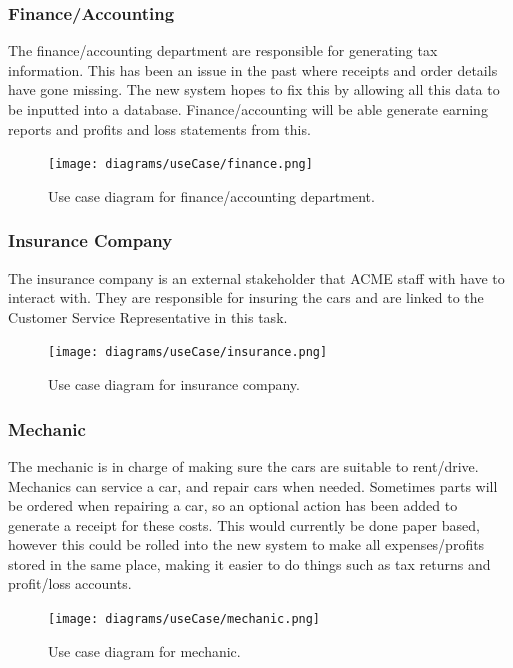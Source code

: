     \subsubsection{Finance/Accounting}
      The finance/accounting department are responsible for generating tax information. This has been an issue in the past where
      receipts and order details have gone missing. The new system hopes to fix this by allowing all this data to be inputted into 
      a database. Finance/accounting will be able generate earning reports and profits and loss statements from this.
      \begin{figure}[H]
        \centering
        \texttt{[image: diagrams/useCase/finance.png]}
        \caption{Use case diagram for finance/accounting department.}
        \label{fig:UCaccounting}
      \end{figure}

    \subsubsection{Insurance Company}
      The insurance company is an external stakeholder that ACME staff with have to interact with. They are responsible for insuring the cars and
      are linked to the Customer Service Representative in this task.
      \begin{figure}[H]
        \centering
        \texttt{[image: diagrams/useCase/insurance.png]}
        \caption{Use case diagram for insurance company.}
        \label{fig:UCinsurance}
      \end{figure}
      
    \subsubsection{Mechanic}
      The mechanic is in charge of making sure the cars are suitable to rent/drive. Mechanics can service a car, and repair cars
      when needed. Sometimes parts will be ordered when repairing a car, so an optional action has been added to generate a receipt
      for these costs. This would currently be done paper based, however this could be rolled into the new system to make all expenses/profits 
      stored in the same place, making it easier to do things such as tax returns and profit/loss accounts.
      \begin{figure}[H]
        \centering
        \texttt{[image: diagrams/useCase/mechanic.png]}
        \caption{Use case diagram for mechanic.}
        \label{fig:UCmechanic}
      \end{figure}

